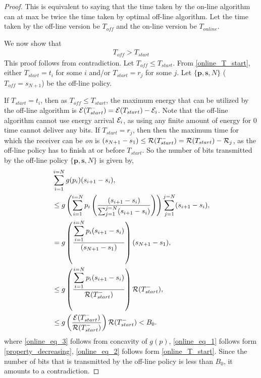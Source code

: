 \begin{proof}
This is equivalent to saying that the time taken by the on-line algorithm can at max be twice the time taken by optimal off-line algorithm. Let the time taken by the off-line version be $T_{off}$ and the on-line version be $T_{online}$. 

We now show that 
\begin{align}
T_{off} > T_{start}
\label{online_time}
\end{align}
This proof follows from contradiction. Let $T_{off}\le T_{start}$. From \eqref{online_T_start}, either $T_{start}=t_i$ for some $i$ and/or $T_{start}=r_j$ for some $j$. Let $\{\textbf{p},\textbf{s},N\}$ ($T_{off}=s_{N+1}$) be the off-line policy.

If $T_{start}=t_i$, then as $T_{off}\le T_{start}$, the maximum energy that can be utilized by the off-line algorithm is $\mathcal{E}(T_{start}^-)=\mathcal{E}(T_{start})-\mathcal{E}_i$. Note that the off-line algorithm cannot use energy arrival $\mathcal{E}_i$, as using any finite amount of energy for 0 time cannot deliver any bits. If $T_{start}=r_j$, then then the maximum time for which the receiver can be \textit{on} is $(s_{N+1}-s_1) \le\mathcal{R}(T_{start}^-)=\mathcal{R}(T_{start})-\mathcal{R}_j$, as the off-line policy has to finish at or before $T_{start}$. 
So the number of bits transmitted by the off-line policy $\{\textbf{p},\textbf{s},N\}$ is given by,
\begin{align}
&\sum_{i=1}^{i=N} g(p_i)(s_{i+1}-s_{i}),
\\
&\le g\left(\sum_{i=1}^{i=N}p_i\left(\frac{(s_{i+1}-s_{i})}{\sum_{j=1}^{j=N}(s_{i+1}-s_{i})}\right)\right) \sum_{j=1}^{j=N} (s_{i+1}-s_{i}),\label{online_eq_3}
\\
&=g\left(\frac{\displaystyle\sum_{i=1}^{i=N}p_i(s_{i+1}-s_{i})}{(s_{N+1}-s_{1})}\right)(s_{N+1}-s_{1}),\label{online_eq_4} 
\\
&\le g\left(\frac{\displaystyle\sum_{i=1}^{i=N}p_i(s_{i+1}-s_{i})}{\TRx(T_{start}^-)}\right)\TRx(T_{start}^-), \label{online_eq_1}
\\
&\le g\left(\frac{\ETx(T_{start}^-)}{\TRx(T_{start}^-)}\right)\TRx(T_{start}^-)<B_0.\label{online_eq_2}
\end{align}
where \eqref{online_eq_3} follows from concavity of $g(p)$, \eqref{online_eq_1} follows form \eqref{property_decreasing}, \eqref{online_eq_2} follows form \eqref{online_T_start}. Since the number of bits that is transmitted by the off-line policy is less than $B_0$, it amounts to a contradiction.

\end{proof}
